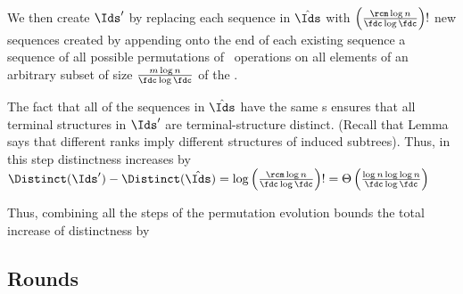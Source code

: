  We then create $\Ids'$ by replacing each sequence in ${\hat{\Ids}}$ with $\left(\frac{\rcm \log n}{\fdc \log \fdc}\right)!$ new sequences created by appending onto the end of each existing sequence a sequence of all possible permutations of \opDc\ operations on all elements of an arbitrary subset of size $\frac{m \log n}{\fdc \log \fdc}$ of the .

The fact that all of the sequences in ${\hat{\Ids}}$ have the same s ensures that all terminal structures in $\Ids'$ are terminal-structure distinct. 
 (Recall that Lemma~ says that different ranks imply different structures of induced subtrees). 
Thus, in this step distinctness increases by $\Distinct(\Ids')-\Distinct({\hat{\Ids}})=\log \left( \frac{\rcm \log n}{\fdc \log \fdc}  \right)! = \Theta\left( \frac{\log n \log \log n}{\fdc \log \fdc} \right)$ 
\begin{fullonly}

Thus, combining all the steps of the permutation evolution bounds the total increase of distinctness by

\end{fullonly}


\subsection{Rounds} 

